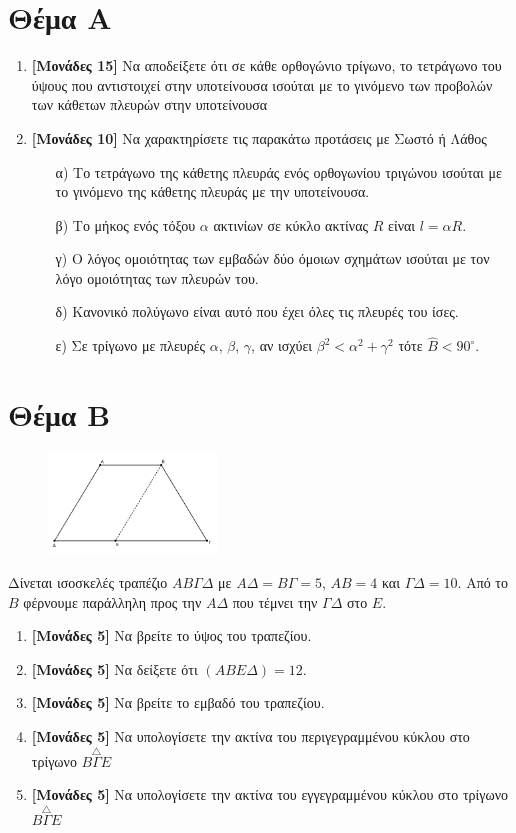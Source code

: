\documentclass[12pt]{article}
\begin{document}
\section*{Θέμα Α}
  \noindent
  \begin{enumerate}
    \item \textbf{[Μονάδες 15]} Να αποδείξετε ότι σε κάθε ορθογώνιο τρίγωνο, το τετράγωνο του ύψους που αντιστοιχεί στην υποτείνουσα ισούται με το γινόμενο των προβολών των κάθετων πλευρών στην υποτείνουσα
    \item \textbf{[Μονάδες 10]}  Να χαρακτηρίσετε τις παρακάτω προτάσεις με Σωστό ή Λάθος
    \begin{enumerate}
      \item [α)] Το τετράγωνο της κάθετης πλευράς ενός ορθογωνίου τριγώνου ισούται με το γινόμενο της κάθετης πλευράς με την υποτείνουσα.
      \item [β)] Το μήκος ενός τόξου $α$ ακτινίων σε κύκλο ακτίνας $R$ είναι $l=αR$.
      \item [γ)] Ο λόγος ομοιότητας των εμβαδών δύο όμοιων σχημάτων ισούται με τον λόγο ομοιότητας των πλευρών του.
      \item [δ)] Κανονικό πολύγωνο είναι αυτό που έχει όλες τις πλευρές του ίσες.
      \item [ε)] Σε τρίγωνο με πλευρές $α$, $β$, $γ$, αν ισχύει $β^2<α^2+γ^2$ τότε $\hat{Β}<90^{\circ}$.
    \end{enumerate}
  \end{enumerate}

\section*{Θέμα Β}
  \noindent
  \begin{figure}
    \centering
    \vspace{-20pt}
    \includegraphics[width=0.4\textwidth]{2017BGeo2}
  \end{figure}
  Δίνεται ισοσκελές τραπέζιο $ΑΒΓΔ$ με $ΑΔ=ΒΓ=5$, $ΑΒ=4$ και $ΓΔ=10$. Από το $Β$ φέρνουμε παράλληλη προς την $ΑΔ$ που τέμνει την $ΓΔ$ στο $Ε$.
  \begin{enumerate}
    \item \textbf{[Μονάδες 5]}  Να βρείτε το ύψος του τραπεζίου.
    \item \textbf{[Μονάδες 5]}  Να δείξετε ότι $(ΑΒΕΔ)=12$.
    \item \textbf{[Μονάδες 5]}  Να βρείτε το εμβαδό του τραπεζίου.
    \item \textbf{[Μονάδες 5]}  Να υπολογίσετε την ακτίνα του περιγεγραμμένου κύκλου στο τρίγωνο $\overset{\triangle}{ΒΓΕ}$
    \item \textbf{[Μονάδες 5]}  Να υπολογίσετε την ακτίνα του εγγεγραμμένου κύκλου στο τρίγωνο $\overset{\triangle}{ΒΓΕ}$
  \end{enumerate}
\end{document}
